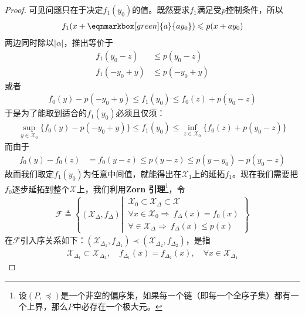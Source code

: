 \begin{enumerate}[leftmargin=2cm, label=\arabic*]
\begin{proof}
可见问题只在于决定$f_1(y_0)$的值。既然要求$f_1$满足受$p$控制条件，所以
\vspace{0.5em}
\begin{align*}
    f_1(x+\eqnmarkbox[green]{a}{ay_0}) \leqslant p(x+ay_0)
\end{align*}
两边同时除以$|\alpha|$，推出等价于
\begin{align*}
    f_1(y_0-z) &\leqslant p(y_0-z)\\
    f_1(-y_0+y) &\leqslant p(-y_0 + y) 
\end{align*}
或者
\begin{align*}
    f_0(y) - p(-y_0 + y) \leqslant f_1(y_0) \leqslant f_0(z) + p(y_0-z)
\end{align*}
于是为了能取到适合的$f_1(y_0)$必须且仅须：
\begin{align*}
    \sup\limits_{y\in\mathscr{X}_0} \{f_0(y) - p(-y_0+y)\} \leqslant f_1(y_0) \leqslant \inf\limits_{z\in\mathscr{X}_0} \{f_0(z) + p(y_0-z)\}
\end{align*}
而由于
\begin{align*}
    f_0(y) - f_0(z) &= f_0(y-z) \leqslant p(y-z) \leqslant p(y-y_0) - p(y_0 - z)
\end{align*}
故而我们取定$f_1(y_0)$为任意中间值，就能得出在$\mathscr{X}_1$上的延拓$f_1$。现在我们需要把$f_0$逐步延拓到整个$\mathscr{X}$上，我们利用\textbf{Zorn 引理}\footnote{设$(P,\preceq)$是一个非空的偏序集，如果每一个链（即每一个全序子集）都有一个上界，那么$P$中必存在一个极大元。}，令
\begin{align*}
    \mathscr{F} \triangleq \left\lbrace (\mathscr{X}_{\Delta}, f_{\Delta}) \left|\ \begin{array}{l}
         \mathscr{X}_0\subset \mathscr{X}_{\Delta}\subset \mathscr{X}  \\
          \forall x\in\mathscr{X}_0\Longrightarrow\ f_{\Delta}(x) = f_0(x) \\
          \forall \in\mathscr{X}_{\Delta} \Longrightarrow\ f_{\Delta}(x) \leqslant p(x)
    \end{array}\right. \right\rbrace
\end{align*}
在$\mathscr{F}$引入序关系如下：$(\mathscr{X}_{\Delta_1},f_{\Delta_1})\prec (\mathscr{X}_{\Delta_2},f_{\Delta_2})$，是指
\begin{align*}
    \mathscr{X}_{\Delta_1}\subset \mathscr{X}_{\Delta_2},\quad f_{\Delta_1}(x) = f_{\Delta_2}(x), \quad \forall x\in\mathscr{X}_{\Delta_1}
\end{align*}

\end{proof}
\end{enumerate}
